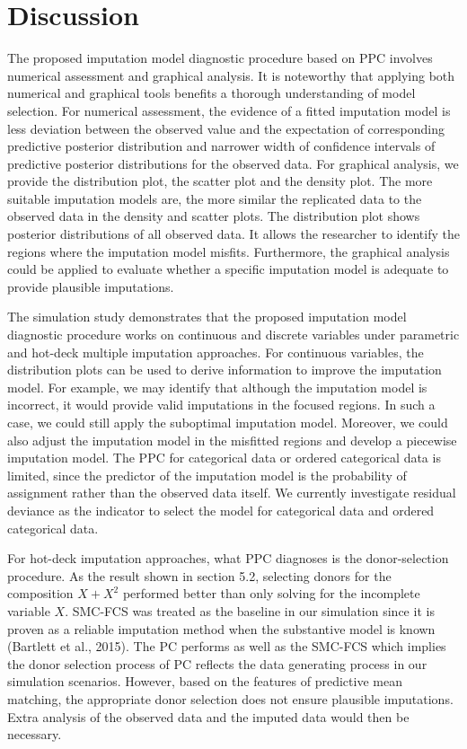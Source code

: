 \documentclass[12pt, fullpage, a4paper]{article}
\begin{document}
\section{Discussion}
The proposed imputation model diagnostic procedure based on PPC involves numerical assessment and graphical analysis. It is noteworthy that applying both numerical and graphical tools benefits a thorough understanding of model selection. For numerical assessment, the evidence of a fitted imputation model is less deviation between the observed value and the expectation of corresponding predictive posterior distribution and narrower width of confidence intervals of predictive posterior distributions for the observed data. For graphical analysis, we provide the distribution plot, the scatter plot and the density plot. The more suitable imputation models are, the more similar the replicated data to the observed data in the density and scatter plots. The distribution plot shows posterior distributions of all observed data. It allows the researcher to identify the regions where the imputation model misfits. Furthermore, the graphical analysis could be applied to evaluate whether a specific imputation model is adequate to provide plausible imputations. 

The simulation study demonstrates that the proposed imputation model diagnostic procedure works on continuous and discrete variables under parametric and hot-deck multiple imputation approaches. For continuous variables, the distribution plots can be used to derive information to improve the imputation model. For example, we may identify that although the imputation model is incorrect, it would provide valid imputations in the focused regions. In such a case, we could still apply the suboptimal imputation model. Moreover, we could also adjust the imputation model in the misfitted regions and develop a piecewise imputation model. The PPC for categorical data or ordered categorical data is limited, since the predictor of the imputation model is the probability of assignment rather than the observed data itself. We currently investigate residual deviance as the indicator to select the model for categorical data and ordered categorical data.

For hot-deck imputation approaches, what PPC diagnoses is the donor-selection procedure. As the result shown in section 5.2, selecting donors for the composition $X + X^2$ performed better than only solving for the incomplete variable $X$. SMC-FCS was treated as the baseline in our simulation since it is proven as a reliable imputation method when the substantive model is known (Bartlett et al., 2015)\nocite{bartlett2015multiple}. The PC performs as well as the SMC-FCS which implies the donor selection process of PC reflects the data generating process in our simulation scenarios. However, based on the features of predictive mean matching, the appropriate donor selection does not ensure plausible imputations. Extra analysis of the observed data and the imputed data would then be necessary. 
\end{document}
